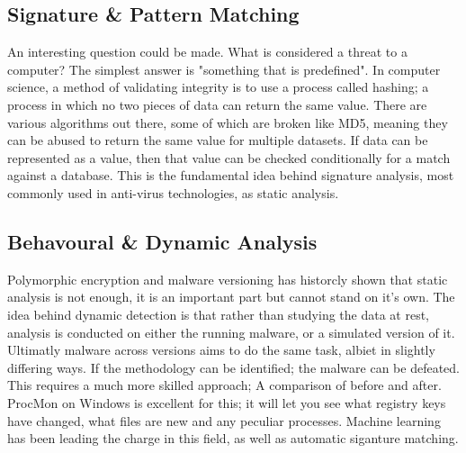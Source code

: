 \subsection{Signature \& Pattern Matching}
An interesting question could be made. What is considered a threat to a computer? The simplest answer is "something that is predefined". 
In computer science, a method of validating integrity is to use a process called hashing; a process in which no two pieces of data can return the same value. 
There are various algorithms out there, some of which are broken like MD5, meaning they can be abused to return the same value for multiple datasets. 
If data can be represented as a value, then that value can be checked conditionally for a match against a database. This is the fundamental idea behind signature analysis,
most commonly used in anti-virus technologies, as static analysis.


\subsection{Behavoural & Dynamic Analysis}
Polymorphic encryption and malware versioning has historcly shown that static analysis is not enough, it is an important part but cannot stand on it's own. The idea behind dynamic detection is that rather than
studying the data at rest, analysis is conducted on either the running malware, or a simulated version of it. Ultimatly malware across versions aims to do the same task, albiet in slightly differing ways. If the methodology
can be identified; the malware can be defeated. This requires a much more skilled approach; A comparison of before and after. ProcMon on Windows is excellent for this; it will let you see what registry keys have changed, what files are new and any peculiar processes.
Machine learning has been leading the charge in this field, as well as automatic siganture matching.


